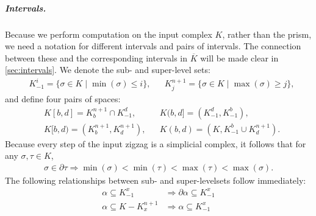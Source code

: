 \documentclass[cleveref,a4paper,english,nolineno]{socg-lipics-v2021}
\renewcommand{\paragraph}[1]{\subparagraph*{#1}}
\newcommand{\prism}[1]{\overline{#1}}
\newcommand{\bdry}{\partial}
\newcommand{\pK}{\prism{K}}
\newcommand{\subK}[1]{K_{-1}^{#1}}
\newcommand{\supK}[1]{K_{#1}^{n+1}}
\newcommand{\ssx}{\sigma}
\newcommand{\tsx}{\tau}
\begin{document}
\paragraph{Intervals.}


Because we perform computation on the input complex $K$, rather than
the prism, we need a notation for different intervals and pairs of intervals.
The connection between these and the corresponding intervals in $\pK$ will be
made clear in \cref{sec:intervals}.
We denote the sub- and super-level sets:
\begin{align*}
  & \subK{i} = \{ \ssx \in K \mid \min(\ssx) \leq i \}, &&
    \supK{j} = \{ \ssx \in K \mid \max(\ssx) \geq j \},
\end{align*}
and define four pairs of spaces:
\begin{align*}
    & K[b,d] = \supK{b} \cap \subK{d}, &
    & K(b,d] = (\subK{d}, \subK{b}), \\
    & K[b,d) = (\supK{b}, \supK{d}), &
    & K(b,d) = (K, \subK{b} \cup \supK{d}).
\end{align*}
Because every step of the input zigzag is a simplicial complex, it follows that
for any $\ssx,\tsx \in K$,
\begin{align}
    \label{eq:face-nests}
    \ssx \in \bdry \tsx \Rightarrow \min(\ssx) < \min(\tsx) < \max(\tsx) < \max(\ssx).
\end{align}
The following relationships between sub- and super-levelsets follow immediately:
\begin{align}
    \alpha \subseteq \subK{x} & \Rightarrow \bdry \alpha \subseteq \subK{x} \label{eq:bdry-sub} \\
    \alpha \subseteq K - \supK{x} & \Rightarrow \alpha \subseteq \subK{x} \label{eq:sup-sub}
\end{align}
\end{document}
